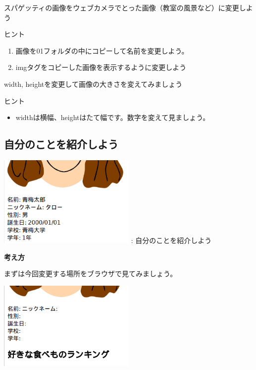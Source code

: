\documentclass[a4paper,12pt]{jarticle}
\begin{document}
\theQuestion

スパゲッティの画像をウェブカメラでとった画像（教室の風景など）に変更しよう

ヒント

\begin{enumerate}
  \item
        画像を01フォルダの中にコピーして名前を変更しよう。
  \item
        imgタグをコピーした画像を表示するように変更しよう
\end{enumerate}
\theQuestion\label{Q:hasAnswer04-3}

width,
heightを変更して画像の大きさを変えてみましょう

ヒント

\begin{itemize}
  \item
        widthは横幅、heightはたて幅です。数字を変えて見ましょう。
\end{itemize}


\clearpage
{}
\subsection{\theExercise 自分のことを紹介しよう}
\centering
\begin{minipage}{\textwidth}
  \includegraphics[width=0.5\textwidth]{textbook-img173.png}
  \newline
  : 自分のことを紹介しよう
\end{minipage}

\bigskip

\flushleft

\textbf{考え方}


\bigskip

まずは今回変更する場所をブラウザで見てみましょう。

\includegraphics[width=0.5\textwidth]{textbook-img175.png}
\end{document}

